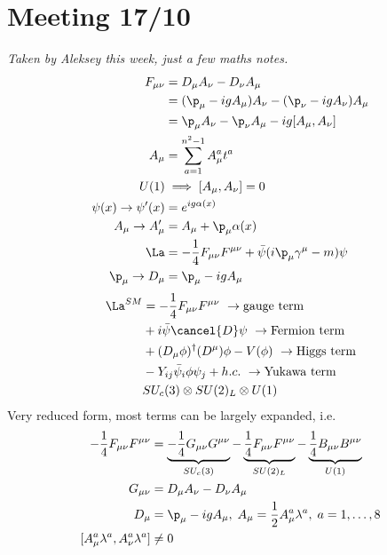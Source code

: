 \documentclass[a4paper, 11pt, normalem]{article}
\begin{document}
\section*{Meeting 17/10}
\textit{Taken by Aleksey this week, just a few maths notes.}
\begin{align}
    F_{\mu\nu} &= D_\mu A_\nu - D_\nu A_\mu \\
               &= (\p_\mu - igA_\mu)A_\nu - (\p_\nu - igA_\nu)A_\mu \\
               &= \p_\mu A_\nu - \p_\nu A_\mu - ig[A_\mu,A_\nu] \\
    A_\mu &= \sum_{a=1}^{n^2-1} A_\mu^at^a \\
    U(1) &\implies [A_\mu,A_\nu] = 0 \\
    \psi(x) \to \psi'(x) &= e^{ig\alpha(x)} \\
    A_\mu \to A_\mu' &= A_\mu + \p_\mu\alpha(x) \\
    \La &= -\frac14 F_{\mu\nu}F^{\mu\nu} + \bar{\psi}(i\p_\mu\gamma^\mu - m)\psi \\
    \p_\mu \to D_\mu &= \p_\mu - igA_\mu 
\end{align}
\begin{align}
    \La^{SM} &= -\frac14 F_{\mu\nu}F^{\mu\nu}~ \to \text{gauge term} \\ 
             &+ i\bar{\psi}\cancel{D}\psi ~ \to \text{Fermion term} \\
             &+ (D_\mu\phi)^\dagger(D^\mu)\phi - V(\phi) ~ \to \text{Higgs term} \\
             &- Y_{ij}\bar{\psi}_i\phi\psi_j + h.c. ~ \to \text{Yukawa term} \\
             & SU_c(3)\otimes SU(2)_L\otimes U(1)
\end{align}
Very reduced form, most terms can be largely expanded, i.e.
\begin{align}
    -\frac14 F_{\mu\nu}F^{\mu\nu} &= \underbrace{-\frac14 G_{\mu\nu}G^{\mu\nu}}_{SU_c(3)} - \underbrace{\frac14 F_{\mu\nu}F^{\mu\nu}}_{SU(2)_L} - \underbrace{\frac14 B_{\mu\nu}B^{\mu\nu}}_{U(1)} \\
    G_{\mu\nu} &= D_\mu A_\nu - D_\nu A_\mu \\
    D_\mu &= \p_\mu - igA_\mu,\; A_\mu = \frac12 A_\mu^a\lambda^a,\; a = 1,\dots,8 \\
    [A_\mu^a\lambda^a,A_\nu^a\lambda^a] &\neq 0
\end{align}
\end{document}
